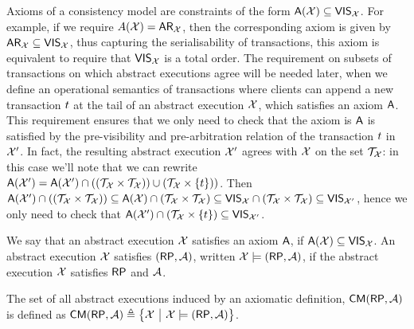 Axioms of a consistency model are constraints of the form $\mathsf{A}(\mathcal{X}) \subseteq \mathsf{VIS}_{\mathcal{X}}$. 
For example, if we require $A(\mathcal{X}) = \mathsf{AR}_{\mathcal{X}}$, 
then the corresponding axiom is given by $\mathsf{AR}_{\mathcal{X}} \subseteq \mathsf{VIS}_{\mathcal{X}}$,
thus capturing the serialisability of transactions,
\ie this axiom is equivalent to require that $\mathsf{VIS}_{\mathcal{X}}$ is a total order.
The requirement on subsets of transactions on which 
abstract executions agree will be needed later, 
when we define an operational semantics of transactions where 
clients can append a new transaction $t$ at the tail of an abstract execution $\mathcal{X}$,
which satisfies an axiom $\mathsf{A}$. This requirement ensures that 
we only need to check that the axiom is $\mathsf{A}$ is satisfied by the pre-visibility 
and pre-arbitration relation of the transaction $t$ in $\mathcal{X}'$. 
In fact, the resulting abstract execution $\mathcal{X}'$ agrees with $\mathcal{X}$ on the set $\mathcal{T}_{\mathcal{X}}$: 
in this case we'll note that we can rewrite 
$\mathsf{A}(\mathcal{X}') = \mathsf{A}(\mathcal{X}') \cap ((\mathcal{T}_{\mathcal{X}} \times \mathcal{T}_{\mathcal{X}}) ) \cup (\mathcal{T}_{\mathcal{X}} \times \{t\}))$.
Then
$\mathsf{A}(\mathcal{X}') \cap ((\mathcal{T}_{\mathcal{X}} \times \mathcal{T}_{\mathcal{X}})) \subseteq \mathsf{A}(\mathcal{X}) \cap (\mathcal{T}_{\mathcal{X}} \times \mathcal{T}_{\mathcal{X}}) \subseteq \mathsf{VIS}_{\mathcal{X}} \cap (\mathcal{T}_{\mathcal{X}} \times \mathcal{T}_{\mathcal{X}}) \subseteq \mathsf{VIS}_{\mathcal{X}'}$, 
hence we only need to check that $\mathsf{A}(\mathcal{X}') \cap (\mathcal{T}_{\mathcal{X}} \times \{t\}) \subseteq \mathsf{VIS}_{\mathcal{X}'}$.

We say that an abstract execution $\mathcal{X}$ satisfies an axiom $\mathsf{A}$, 
if $\mathsf{A}(\mathcal{X}) \subseteq \mathsf{VIS}_{\mathcal{X}}$. 
An abstract execution $\mathcal{X}$ satisfies $(\RP,\Ax)$, written $\aexec \models (\RP,\Ax)$,  
if the abstract execution \( \mathcal{X} \) satisfies \( \RP \) and \( \mathcal{A} \).

\begin{definition}
\label{def:axiom-to-aexec}
The set of all abstract executions induced by an axiomatic definition, \( \CMa(\RP,\Ax)\) is defined as \( \CMa(\RP,\Ax) \defeq \Setcon{\aexec}{\aexec \models (\RP,\Ax)}\).
\end{definition}

